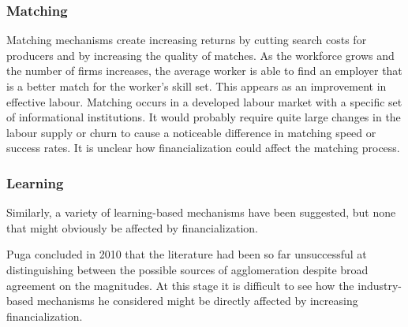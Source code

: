 \subsubsection{Matching}
Matching mechanisms create increasing returns by cutting search costs for producers and by increasing the quality of matches. As the workforce grows and the number of firms increases, the average worker is able to find an employer that is a better match for the worker's skill set. This appears as an improvement in effective labour. Matching occurs in a developed labour market with a specific set of informational institutions. It would probably require  quite large changes in the labour supply or churn to cause a noticeable difference in matching speed or success rates. It is unclear how financialization could affect the matching process.

\subsubsection{Learning}
Similarly, a variety of learning-based mechanisms have been suggested, but none that might obviously  be affected by financialization. 

Puga \cite{pugaMagnitudeCausesAgglomeration2010} concluded in 2010 that the literature had been so far unsuccessful at distinguishing between the possible sources of agglomeration  despite broad agreement on the magnitudes. 
At this stage it is difficult to see how the industry-based mechanisms he considered might be directly affected by  increasing financialization.




